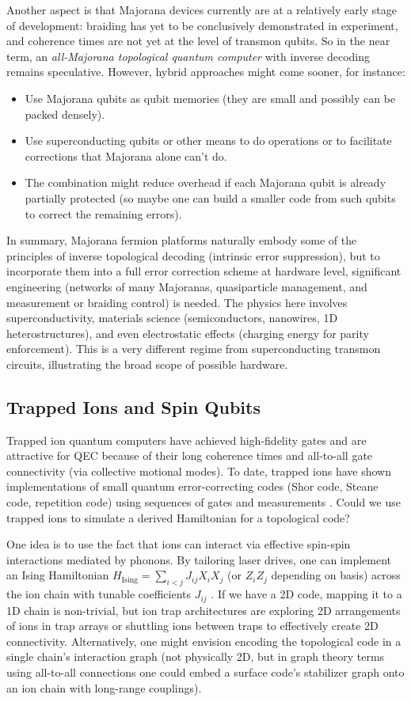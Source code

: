 \documentclass[11pt]{article}
\begin{document}
Another aspect is that Majorana devices currently are at a relatively early stage of development: braiding has yet to be conclusively demonstrated in experiment, and coherence times are not yet at the level of transmon qubits. So in the near term, an \emph{all-Majorana topological quantum computer} with inverse decoding remains speculative. However, hybrid approaches might come sooner, for instance:
\begin{itemize}
    \item Use Majorana qubits as qubit memories (they are small and possibly can be packed densely).
    \item Use superconducting qubits or other means to do operations or to facilitate corrections that Majorana alone can't do.
    \item The combination might reduce overhead if each Majorana qubit is already partially protected (so maybe one can build a smaller code from such qubits to correct the remaining errors).
\end{itemize}

In summary, Majorana fermion platforms naturally embody some of the principles of inverse topological decoding (intrinsic error suppression), but to incorporate them into a full error correction scheme at hardware level, significant engineering (networks of many Majoranas, quasiparticle management, and measurement or braiding control) is needed. The physics here involves superconductivity, materials science (semiconductors, nanowires, 1D heterostructures), and even electrostatic effects (charging energy for parity enforcement). This is a very different regime from superconducting transmon circuits, illustrating the broad scope of possible hardware.

\subsection{Trapped Ions and Spin Qubits}
Trapped ion quantum computers have achieved high-fidelity gates and are attractive for QEC because of their long coherence times and all-to-all gate connectivity (via collective motional modes). To date, trapped ions have shown implementations of small quantum error-correcting codes (Shor code, Steane code, repetition code) using sequences of gates and measurements \cite{RyanAnderson2021}. Could we use trapped ions to simulate a derived Hamiltonian for a topological code?

One idea is to use the fact that ions can interact via effective spin-spin interactions mediated by phonons. By tailoring laser drives, one can implement an Ising Hamiltonian $H_{\text{Ising}} = \sum_{i<j} J_{ij} X_i X_j$ (or $Z_i Z_j$ depending on basis) across the ion chain with tunable coefficients $J_{ij}$ \cite{Monroe2019}. If we have a 2D code, mapping it to a 1D chain is non-trivial, but ion trap architectures are exploring 2D arrangements of ions in trap arrays or shuttling ions between traps to effectively create 2D connectivity. Alternatively, one might envision encoding the topological code in a single chain's interaction graph (not physically 2D, but in graph theory terms using all-to-all connections one could embed a surface code's stabilizer graph onto an ion chain with long-range couplings).
\end{document}
